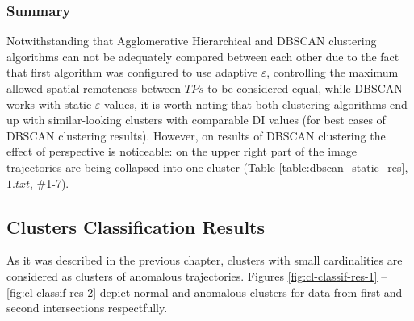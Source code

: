 \subsubsection{Summary}

Notwithstanding that Agglomerative Hierarchical and DBSCAN clustering algorithms can not be adequately compared between each other due to the fact that first algorithm was configured to use adaptive $\varepsilon$, controlling the maximum allowed spatial remoteness between $TPs$ to be considered equal, while DBSCAN works with static $\varepsilon$ values, it is worth noting that both clustering algorithms end up with similar-looking clusters with comparable DI values (for best cases of DBSCAN clustering results). However, on results of DBSCAN clustering the effect of perspective is noticeable: on the upper right part of the image trajectories are being collapsed into one cluster (Table \ref{table:dbscan_static_res}, $1.txt$, \#1-7).

\subsection{Clusters Classification Results}

As it was described in the previous chapter, clusters with small cardinalities are considered as clusters of anomalous trajectories. Figures \ref{fig:cl-classif-res-1} -- \ref{fig:cl-classif-res-2} depict normal and anomalous clusters for data from first and second intersections respectfully.

